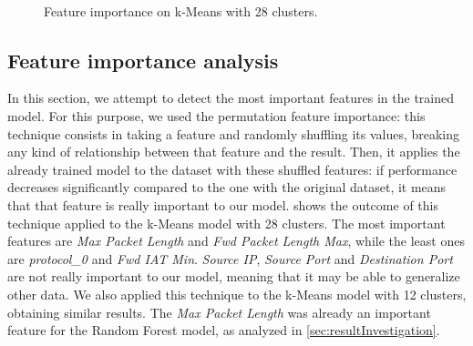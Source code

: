 \documentclass[acmlarge,nonacm]{acmart}
\begin{document}
\begin{figure}
	\centering
     \quad
	 \\
  	\caption{Feature importance on k-Means with 28 clusters.} 
\end{figure}

\subsection{Feature importance analysis}\label{sec:featureImportanceUL}
In this section, we attempt to detect the most important features in the trained model. For this purpose, we used the permutation feature importance: this technique consists in taking a feature and randomly shuffling its values, breaking any kind of relationship between that feature and the result. Then, it applies the already trained model to the dataset with these shuffled features: if performance decreases significantly compared to the one with the original dataset, it means that that feature is really important to our model.  shows the outcome of this technique applied to the k-Means model with 28 clusters. The most important features are \emph{Max Packet Length} and \emph{Fwd Packet Length Max}, while the least ones are \emph{protocol\_0} and \emph{Fwd IAT Min}. \emph{Source IP}, \emph{Source Port} and \emph{Destination Port} are not really important to our model, meaning that it may be able to generalize other data. We also applied this technique to the k-Means model with 12 clusters, obtaining similar results. The \emph{Max Packet Length} was already an important feature for the Random Forest model, as analyzed in \cref{sec:resultInvestigation}.
\end{document}
